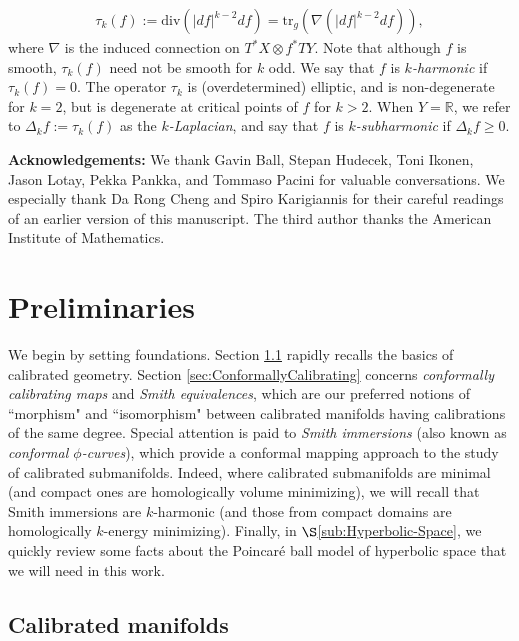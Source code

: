 \documentclass[11pt]{article}
\newcommand{\R}{\mathbb{R}}
\theoremstyle{definition}
\numberwithin{equation}{section}
\begin{document}
\begin{itemize}
\begin{align*}
\tau_k(f)  := \mathrm{div}(|df|^{k-2} df) =\mathrm{tr}_g (\nabla (|df|^{k-2} df)),
\end{align*}
where $\nabla$ is the induced connection on $T^{*}X \otimes f^{*}TY$.  Note that although $f$ is smooth, $\tau_k(f)$ need not be smooth for $k$ odd.  We say that $f$ is \emph{$k$-harmonic} if $\tau_k(f) = 0$.  The operator $\tau_k$ is (overdetermined) elliptic, and is non-degenerate for $k = 2$, but is degenerate at critical points of $f$ for $k > 2$.  When $Y = \R$, we refer to $\Delta_kf := \tau_k(f)$ as the \emph{$k$-Laplacian}, and say that $f$ is \emph{$k$-subharmonic} if $\Delta_k f \geq 0$.
\end{itemize}


\noindent \textbf{Acknowledgements:} We thank Gavin Ball, Stepan Hudecek, Toni Ikonen, Jason Lotay, Pekka Pankka, and Tommaso Pacini for valuable conversations.  We especially thank Da Rong Cheng and Spiro Karigiannis for their careful readings of an earlier version of this manuscript.  The third author thanks the American Institute of Mathematics.
 
\section{Preliminaries}

\indent \indent We begin by setting foundations.  Section \ref{sec:Calibrated} rapidly recalls the basics of calibrated geometry.  Section \ref{sec:ConformallyCalibrating} concerns \emph{conformally calibrating maps} and \emph{Smith equivalences}, which are our preferred notions of ``morphism" and ``isomorphism" between calibrated manifolds having calibrations of the same degree.  Special attention is paid to \emph{Smith immersions} (also known as \emph{conformal $\phi$-curves}), which provide a conformal mapping approach to the study of calibrated submanifolds.  Indeed, where calibrated submanifolds are minimal (and compact ones are homologically volume minimizing), we will recall that Smith immersions are $k$-harmonic (and those from compact domains are homologically $k$-energy minimizing).  Finally, in $\S$\ref{sub:Hyperbolic-Space}, we quickly review some facts about the Poincar\'{e} ball model of hyperbolic space that we will need in this work.

\subsection{Calibrated manifolds} \label{sec:Calibrated}
\end{document}
